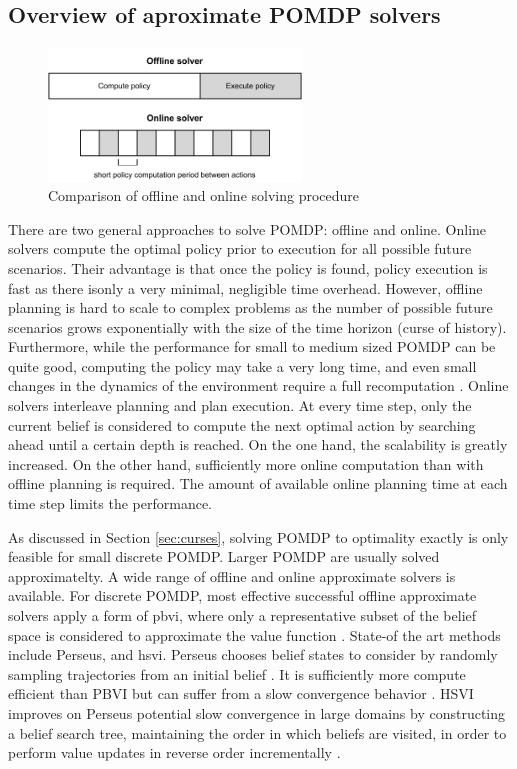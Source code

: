 \subsection{Overview of aproximate POMDP solvers}
\label{sec:solvers}

\begin{figure}[htbp]
    \centering
    \includegraphics[width=0.6\textwidth]{figures/online-offline.pdf}
    \caption{Comparison of offline and online solving procedure}
\end{figure}

\noindent
There are two general approaches to solve POMDP: offline and online. Online solvers compute the optimal policy prior to execution for all possible future scenarios. Their advantage is that once the policy is found, policy execution is fast as there isonly a very minimal, negligible time overhead. However, offline planning is hard to scale to complex problems as the number of possible future scenarios grows exponentially with the size of the time horizon (curse of history). Furthermore, while the performance for small to medium sized POMDP can be quite good, computing the policy may take a very long time, and even small changes in the dynamics of the environment require a full recomputation \parencite{online_pomdp}. Online solvers interleave planning and plan execution. At every time step, only the current belief is considered to compute the next optimal action by searching ahead until a certain depth is reached. On the one hand, the scalability is greatly increased. On the other hand, sufficiently more online computation than with offline planning is required. The amount of available online planning time at each time step limits the performance. 

As discussed in Section \ref{sec:curses}, solving POMDP to optimality exactly is only feasible for small discrete POMDP. Larger POMDP are usually solved approximatelty. A wide range of offline and online approximate solvers is available. For discrete POMDP, most effective successful offline approximate solvers apply a form of \gls{pbvi}, where only a representative subset of the belief space is considered to approximate the value function \parencite{pomdp-point-based-value}. State-of the art methods include Perseus, and \gls{hsvi}. Perseus chooses belief states to consider by randomly sampling trajectories from an initial belief \parencite{pomdp_perseus}. It is sufficiently more compute efficient than PBVI but can suffer from a slow convergence behavior \parencite{pbvi-survey}. HSVI improves on Perseus potential slow convergence in large domains by constructing a belief search tree, maintaining the order in which beliefs are visited, in order to perform value updates in reverse order incrementally \parencite{solver_hsvi}.

